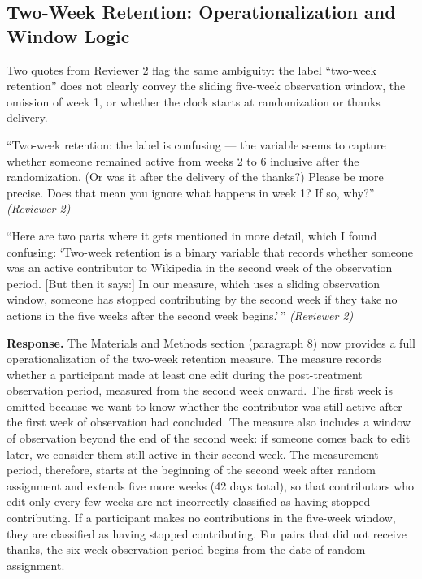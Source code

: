 \documentclass[12pt]{article}
\newenvironment{reviewquote}{%
  \def\FrameCommand{{\color{quotebarcolor}\vrule width 2pt}\colorbox{quotebg}}%
  \MakeFramed{\advance\hsize-\width \FrameRestore}%
  \small
}{%
  \endMakeFramed
}
\newcommand{\sectionnote}[1]{\par\smallskip#1\par\medskip}
\begin{document}
\subsection{Two-Week Retention: Operationalization and Window Logic}

\sectionnote{Two quotes from Reviewer 2 flag the same ambiguity: the label ``two-week retention'' does not clearly convey the sliding five-week observation window, the omission of week 1, or whether the clock starts at randomization or thanks delivery.}

\begin{reviewquote}
``Two-week retention: the label is confusing --- the variable seems to capture whether someone remained active from weeks 2 to 6 inclusive after the randomization. (Or was it after the delivery of the thanks?) Please be more precise. Does that mean you ignore what happens in week 1? If so, why?'' \textit{(Reviewer 2)}
\end{reviewquote}

\begin{reviewquote}
``Here are two parts where it gets mentioned in more detail, which I found confusing: `Two-week retention is a binary variable that records whether someone was an active contributor to Wikipedia in the second week of the observation period. [But then it says:] In our measure, which uses a sliding observation window, someone has stopped contributing by the second week if they take no actions in the five weeks after the second week begins.'\,'' \textit{(Reviewer 2)}
\end{reviewquote}

\textbf{Response.} The Materials and Methods section (paragraph 8) now provides a full operationalization of the two-week retention measure. The measure records whether a participant made at least one edit during the post-treatment observation period, measured from the second week onward. The first week is omitted because we want to know whether the contributor was still active after the first week of observation had concluded. The measure also includes a window of observation beyond the end of the second week: if someone comes back to edit later, we consider them still active in their second week. The measurement period, therefore, starts at the beginning of the second week after random assignment and extends five more weeks (42 days total), so that contributors who edit only every few weeks are not incorrectly classified as having stopped contributing. If a participant makes no contributions in the five-week window, they are classified as having stopped contributing. For pairs that did not receive thanks, the six-week observation period begins from the date of random assignment.
\end{document}
